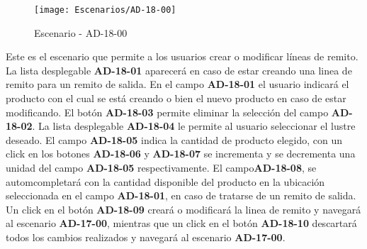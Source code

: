 \begin{figure}[H]
\centering
\texttt{[image: Escenarios/AD-18-00]}
\caption{Escenario - AD-18-00}
\label{fig:AD-18-00}
\end{figure}
Este es el escenario que permite a los usuarios crear o modificar líneas de remito. La lista desplegable \textbf{AD-18-01} aparecerá en caso de estar creando una linea de remito para un remito de salida. En el campo \textbf{AD-18-01} el usuario indicará el producto con el cual se está creando o bien el nuevo producto en caso de estar modificando. El botón \textbf{AD-18-03} permite eliminar la selección del campo \textbf{AD-18-02}. La lista desplegable \textbf{AD-18-04} le permite al usuario seleccionar el lustre deseado. El campo \textbf{AD-18-05} indica la cantidad de producto elegido, con un click en los botones \textbf{AD-18-06} y \textbf{AD-18-07} se incrementa y se decrementa una unidad del campo \textbf{AD-18-05} respectivamente. El campo\textbf{AD-18-08}, se automcompletará con la cantidad disponible del producto en la ubicación seleccionada en el campo \textbf{AD-18-01}, en caso de tratarse de un remito de salida. 
Un click en el botón \textbf{AD-18-09} creará o modificará la linea de remito y navegará al escenario \textbf{AD-17-00}, mientras que un click en el botón \textbf{AD-18-10} descartará todos los cambios realizados y navegará al escenario \textbf{AD-17-00}.
\clearpage
